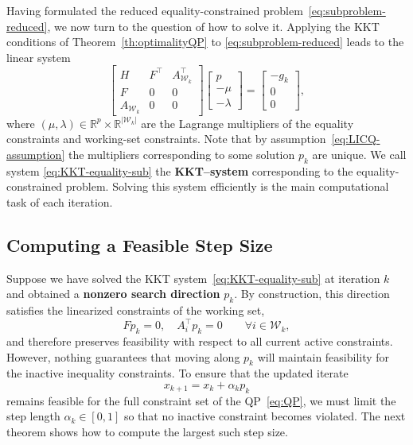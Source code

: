 \documentclass{book}
\theoremstyle{definition}
\numberwithin{algorithm_}{chapter}
\begin{document}
\bigskip

Having formulated the reduced equality-constrained problem~\eqref{eq:subproblem-reduced}, we now turn to the question of how to solve it.  
Applying the KKT conditions of Theorem~\ref{th:optimalityQP} to \eqref{eq:subproblem-reduced} leads to the linear system
\begin{equation} \label{eq:KKT-equality-sub}
\begin{bmatrix}
H & F^\top & A_{\mathcal{W}_k}^\top \\
F & 0 & 0 \\
A_{\mathcal{W}_k} & 0 & 0
\end{bmatrix}
\begin{bmatrix}
p \\ -\mu \\ -\lambda
\end{bmatrix}
=
\begin{bmatrix}
- g_k \\ 0 \\ 0
\end{bmatrix},
\end{equation}
where \((\mu, \lambda) \in \mathbb{R}^p \times \mathbb{R}^{|\mathcal{W}_k|}\) are the Lagrange multipliers of the equality constraints and working-set constraints.  Note that by assumption~\eqref{eq:LICQ-assumption} the multipliers corresponding to some solution $p_k$ are unique.
We call system \eqref{eq:KKT-equality-sub} the \textbf{KKT--system} corresponding to the equality-constrained problem.  
Solving this system efficiently is the main computational task of each iteration.


\subsection{Computing a Feasible Step Size}

Suppose we have solved the KKT system~\eqref{eq:KKT-equality-sub} at iteration \(k\) and obtained a \textbf{nonzero search direction} \(p_k\).  
By construction, this direction satisfies the linearized constraints of the working set,
\[
F p_k = 0, \quad A_i^\top p_k = 0 \qquad \forall i \in \mathcal{W}_k,
\]
and therefore preserves feasibility with respect to all current active constraints. However, nothing guarantees that moving along \(p_k\) will maintain feasibility for the inactive inequality constraints.  
To ensure that the updated iterate
\[
x_{k+1} = x_k + \alpha_k p_k
\]
remains feasible for the full constraint set of the QP~\eqref{eq:QP}, we must limit the step length \(\alpha_k \in [0, 1] \) so that no inactive constraint becomes violated.  
The next theorem shows how to compute the largest such step size.
\end{document}
